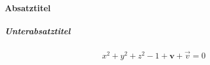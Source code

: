 \documentclass{mfosnapshot}
\begin{document}
\paragraph{Absatztitel}\blindtext[1]
\subparagraph{Unterabsatztitel}\blindtext[1]
\begin{equation}
x^2+y^2+z^2-1+\mathbf{v}+\vec{v}=0
\end{equation}
\blindtext
\end{document}
